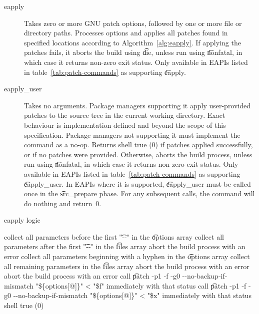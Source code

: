 \begin{description}
\item[eapply]  Takes zero or more GNU patch options, followed by one or more
    file or directory paths. Processes options and applies all patches found in specified locations
    according to Algorithm~\ref{alg:eapply}. If applying the patches fails, it aborts the build
    using \t{die}, unless run using \t{nonfatal}, in which case it returns non-zero exit status.
    Only available in EAPIs listed in table~\ref{tab:patch-commands} as supporting \t{eapply}.

\item[eapply\_user]  Takes no arguments. Package managers supporting it
    apply user-provided patches to the source tree in the current working directory. Exact behaviour
    is implementation defined and beyond the scope of this specification. Package managers not
    supporting it must implement the command as a no-op. Returns shell true (0) if patches applied
    successfully, or if no patches were provided. Otherwise, aborts the build process, unless run
    using \t{nonfatal}, in which case it returns non-zero exit status. Only available in EAPIs
    listed in table~\ref{tab:patch-commands} as supporting \t{eapply\_user}. In EAPIs where it is
    supported, \t{eapply\_user} must be called once in the \t{src\_prepare} phase. For any
    subsequent calls, the command will do nothing and return~0.
\end{description}

\begin{algorithm}
\caption{eapply logic} \label{alg:eapply}
\begin{algorithmic}[1]
    \STATE collect all parameters before the first \t{"-{}-"} in the \t{options} array
    \STATE collect all parameters after the first \t{"-{}-"} in the \t{files} array
    \STATE abort the build process with an error
\ELSE
    \STATE collect all parameters beginning with a hyphen in the \t{options} array
    \STATE collect all remaining parameters in the \t{files} array
\ENDIF
{}
    \STATE abort the build process with an error
\ENDIF
{}
            \STATE abort the build process with an error
        \ENDIF
            \STATE call \t{patch -p1 -f -g0 -{}-no-backup-if-mismatch "\$\{options[@]\}" < "\$f"}
                \RETURN immediately with that status
            \ENDIF
        \ENDFOR
    \ELSE
        \STATE call \t{patch -p1 -f -g0 -{}-no-backup-if-mismatch "\$\{options[@]\}" < "\$x"}
            \RETURN immediately with that status
        \ENDIF
    \ENDIF
\ENDFOR
\RETURN shell true (0)
\end{algorithmic}
\end{algorithm}

